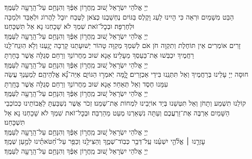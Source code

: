 \documentclass[twoside, openany, parskip=half, 11pt]{book}
\begin{document}
\nefilasapayim \label{nefilas_apayim}

\begin{sometimes}

\setlength{\LTpost}{0pt}

יְיָ אֱלֹהֵי יִשְׂרָאֵל  שׁ֚וּב מֵֽחֲר֣וֹן אַפֶּ֔ךָ וְהִנָּחֵ֥ם עַל־הָֽרָעָ֖ה לְעַמֶּֽךָ׃\\
הַבֵּט מִשָׁמַיִם וּרְאֵה כִּי הָיִינוּ לַעַג וָקֶלֶס בַּגּוֹיִם נֶחְשַׁבְנוּ כְּצֹאן לַטֶּבַח יוּבָל לַהֲרוֹג וּלְאַבֵּד וּלְמַכָּה וּלְחֶרְפָּה׃ וּבְכׇל־זֹאת שִׁמְךָ לֹא שָׁכָחְנוּ נָא אַל תִּשְׁכָּחֵנוּ׃\\
יְיָ אֱלֹהֵי יִשְׂרָאֵל שׁ֚וּב מֵֽחֲר֣וֹן אַפֶּ֔ךָ וְהִנָּחֵ֥ם עַל־הָֽרָעָ֖ה לְעַמֶּֽךָ׃\\
זָרִים אוֹמְרִים אֵין תּוֹחֶלֶת וְתִקְוָה חֹן אֹם לְשִׁמְךָ מְקַוָּה טָהוֹר יְשׁוּעָתֵנוּ קָרְבָה יָגַ֖עְנוּ וְלֹ֥א הֽוּנַֽח־לָֽנוּ רַחֲמֶיךָ יִכְבְּשׁוּ אֶת־כַּעַסְךָ מֵעָלֵינוּ׃ אָנָא שׁוּב מֵחֲרוֹנְךָ וְרַחֵם סְגֻלָּה אֲשֶׁר בָּחָרְתָּ\\
יְיָ אֱלֹהֵי יִשְׂרָאֵל שׁ֚וּב מֵֽחֲר֣וֹן אַפֶּ֔ךָ וְהִנָּחֵ֥ם עַל־הָֽרָעָ֖ה לְעַמֶּֽךָ׃\\
חוּסָה יְיָ עָלֵינוּ בְּרַחֲמֶיךָ וְאַל תִּתְּנֵֽנוּ בִּידֵי אַכְזָרִים׃
לׇׇ֭מָּה יֹֽאמְר֣וּ הַגּוֹיִ֑ם אַיֵּה־נָ֝֗א אֱלֹֽהֵיהֶֽם׃
לְמַעַנְךָ עֲשֵׂה עִמָּנוּ חֶסֶד וְאַל תְּאַחַר׃
אָנָא שׁוּב מֵחֲרוֹנְךָ וְרַחֵם סְגֻלָּה אֲשֶׁר בָּחָֽרְתָּ\\
יְיָ אֱלֹהֵי יִשְׂרָאֵל שׁ֚וּב מֵֽחֲר֣וֹן אַפֶּ֔ךָ וְהִנָּחֵ֥ם עַל־הָֽרָעָ֖ה לְעַמֶּֽךָ׃\\
קוֹלֵנוּ תִשְׁמַע וְתָחֹן וְאַל תִּטְּשֵׁנוּ בְּיַד אוֹיְבֵינוּ לִמְחוֹת אֶת־שְׁמֵנוּ׃
זְכֹר אֲשֶׁר נִשְׁבַּעְתָּ לַאֲבוֹתֵינוּ כְּכוֹכְבֵי הַשָּׁמַיִם אַרְבֶּה אֶת־זַרְעֲכֶם וְעַתָּה נִשְׁאַרְנוּ מְעַט מֵהַרְבֵּה׃
וּבְכׇל־זֹאת שִׁמְךָ לֹא שָׁכָחְנוּ נָא אַל תִּשְׁכָּחֵנוּ׃\\
יְיָ אֱלֹהֵי יִשְׂרָאֵל שׁ֚וּב מֵֽחֲר֣וֹן אַפֶּ֔ךָ וְהִנָּחֵ֥ם עַל־הָֽרָעָ֖ה לְעַמֶּֽךָ׃\\
עׇזְרֵ֤נוּ ׀ אֱלֹ֘הֵ֤י יִשְׁעֵ֗נוּ עַֽל־דְּבַ֥ר כְּבֽוֹד־שְׁמֶ֑ךָ וְהַצִּילֵ֥נוּ וְכַפֵּ֥ר עַל־חַ֝טֹּאתֵ֗ינוּ לְמַ֣עַן שְׁמֶֽךָ׃\\
יְיָ אֱלֹהֵי יִשְׂרָאֵל שׁ֚וּב מֵֽחֲר֣וֹן אַפֶּ֔ךָ וְהִנָּחֵ֥ם עַל־הָֽרָעָ֖ה לְעַמֶּֽךָ׃\\


\end{sometimes}
\end{document}
